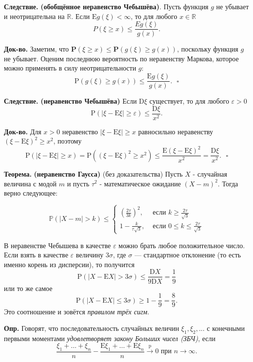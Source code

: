 \documentclass[oneside,final,14pt]{extreport}
\newcommand\mydef{{\bf Опр.}}
\newcommand\mycon{{\bf Следствие.}}
\newcommand\myth{{\bf Теорема.}}
\newcommand\myqed{{\bf Док-во.}}
\newcommand\myprob[1]{{\mathbf{P}(#1)}}
\theoremstyle{definition}
\begin{document}
\mycon{} \textbf{(обобщённое неравенство Чебышёва)}. Пусть функция $g$ не убывает и неотрицательна на $\mathbb{R}.$ Если $\mathrm{E}g(\xi) < \infty$, то для любого $x \in \mathbb{R}$
$$P(\xi \geqslant x) \leqslant \frac{E g(\xi)}{g(x)}.$$

\myqed{} Заметим, что $\myprob{\xi \geqslant x} \leqslant \myprob{g(\xi) \geqslant g(x)}$, поскольку функция $g$ не убывает. Оценим последнюю вероятность по неравенству Маркова, которое можно применять в силу неотрицательности $g$:
$$\mathrm{P}(g(\xi) \geqslant g(x)) \leqslant \frac{\mathrm{E} g(\xi)}{g(x)}. ~~~ \square$$

\mycon{} \textbf{(неравенство Чебышёва)} Если $\mathrm{D}\xi$ существует, то для любого $\varepsilon > 0$
$$\mathrm{P}(|\xi-\mathrm{E} \xi| \geqslant \varepsilon) \leqslant \frac{\mathrm{D} \xi}{x^{2}}.$$

\myqed{} Для $x > 0$ неравенство $|\xi - \mathrm{E}\xi| \geqslant x$ равносильно неравенству $(\xi - \mathrm{E}\xi)^2 \geqslant x^2$, поэтому
$$\mathrm{P}(|\xi-\mathrm{E} \xi| \geqslant x)=\mathrm{P}\left((\xi-\mathrm{E} \xi)^{2} \geqslant x^{2}\right) \leqslant \frac{\mathrm{E}(\xi-\mathrm{E} \xi)^{2}}{x^{2}}=\frac{\mathrm{D} \xi}{x^{2}}. ~~~\square$$

\myth{} \textbf{(неравенство Гаусса)} (без доказательства) Пусть $X$ - случайная величина с модой $m$ и пусть $\tau^2$ - математическое ожидание $(X - m)^2.$ Тогда верно следующее:

$$\mathbb{P}(|X-m|>k) \leq\left\{\begin{array}{ll}
\left(\frac{2 \tau}{3 k}\right)^{2}, & \text { если } k \geq \frac{2 \tau}{\sqrt{3}} \\
1-\frac{k}{\tau \sqrt{3}}, & \text { если } 0 \leq k \leq \frac{2 \tau}{\sqrt{3}}
\end{array}\right.$$

В неравенстве Чебышева в качестве $\varepsilon$ можно брать любое положительное число. Если взять в качестве $\varepsilon$ величину $3\sigma$, где $\sigma$ — стандартное отклонение (то есть именно корень из дисперсии), то получится
$$\mathrm{P}(|X-\mathrm{E} X|>3 \sigma) \leqslant \frac{\mathrm{D} X}{9 \mathrm{D} X}=\frac{1}{9}$$
или то же самое $$\mathrm{P}(|X-\mathrm{E} X| \leqslant 3 \sigma) \geqslant 1-\frac{1}{9}=\frac{8}{9}.$$ 
Это соотношение и зовётся {\it правилом трёх сигм}.

\mydef{} Говорят, что последовательность случайных величин $\xi_1, \xi_2, ...$ с конечными первыми моментами {\it удовлетворяет закону Больших чисел (ЗБЧ)}, если
$$\frac{\xi_{1}+\ldots+\xi_{n}}{n}-\frac{\mathrm{E} \xi_{1}+\ldots+\mathrm{E} \xi_{n}}{n} \stackrel{\mathrm{p}}{\longrightarrow} 0 \text { при } n \rightarrow \infty.$$
\end{document}
